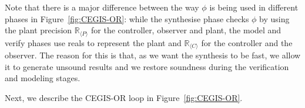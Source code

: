 \documentclass[sigconf]{llncs}
\begin{document}
Note that there is a major difference between
the way $\phi$ is being used in different phases in Figure~\ref{fig:CEGIS-OR}: while the
{\sc synthesise} phase checks $\phi$ by using the plant precision
$\mathbb{R}_{\langle P \rangle}$ for the controller, observer and
plant, the {\sc model} and {\sc verify} phases use reals to represent
the plant and $\mathbb{R}_{\langle C \rangle}$ for the controller and
the observer. The reason for this is that, as we want the
synthesis to be fast, we allow it to generate unsound results
and we restore soundness during the verification and modeling stages.

\medskip

Next, we describe the CEGIS-OR loop in Figure~\ref{fig:CEGIS-OR}.
\end{document}
